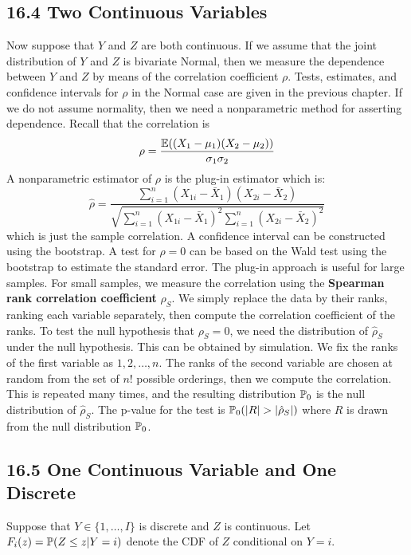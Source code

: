 \subsection*{16.4 Two Continuous
Variables}\label{two-continuous-variables}
Now suppose that \(Y\) and \(Z\) are both continuous. If we assume that
the joint distribution of \(Y\) and \(Z\) is bivariate Normal, then we
measure the dependence between \(Y\) and \(Z\) by means of the
correlation coefficient \(\rho\). Tests, estimates, and confidence
intervals for \(\rho\) in the Normal case are given in the previous
chapter. If we do not assume normality, then we need a nonparametric
method for asserting dependence.
Recall that the correlation is
\[
\rho = \frac{\operatorname{\mathbb{E}}((X_{1} - \mu_{1})(X_{2} - \mu_{2}))}{\sigma_{1} \sigma_{2}}
\]
A nonparametric estimator of \(\rho\) is the plug-in estimator which is:
\[
\hat{\rho} = \frac{\sum_{i=1}^{n} (X_{1i} - \bar{X}_{1})(X_{2i} - \bar{X}_{2})}{\sqrt{\sum_{i=1}^{n} (X_{1i} - \bar{X}_{1})^{2} \sum_{i=1}^{n} (X_{2i} - \bar{X}_{2})^{2}}}
\]
which is just the sample correlation. A confidence interval can be
constructed using the bootstrap. A test for \(\rho = 0\) can be based on
the Wald test using the bootstrap to estimate the standard error.
The plug-in approach is useful for large samples. For small samples, we
measure the correlation using the \textbf{Spearman rank correlation
coefficient} \(\hat{\rho}_S\). We simply replace the data by their
ranks, ranking each variable separately, then compute the correlation
coefficient of the ranks.
To test the null hypothesis that \(\rho_S = 0\), we need the
distribution of \(\hat{\rho}_S\) under the null hypothesis. This can be
obtained by simulation. We fix the ranks of the first variable as
\(1, 2, \dots, n\). The ranks of the second variable are chosen at
random from the set of \(n!\) possible orderings, then we compute the
correlation. This is repeated many times, and the resulting distribution
\(\operatorname{\mathbb{P}}_{0}\) is the null distribution of \(\hat{\rho}_S\). The
p-value for the test is \(\operatorname{\mathbb{P}}_{0}(|R| > |\hat{\rho}_S|)\) where
\(R\) is drawn from the null distribution \(\operatorname{\mathbb{P}}_{0}\).

\subsection*{16.5 One Continuous Variable and One
Discrete}\label{one-continuous-variable-and-one-discrete}
Suppose that \(Y \in \{ 1, \dots, I \}\) is discrete and \(Z\) is
continuous. Let \(F_{i}(z) = \operatorname{\mathbb{P}}(Z \leq z | Y = i)\) denote the CDF
of \(Z\) conditional on \(Y = i\).

